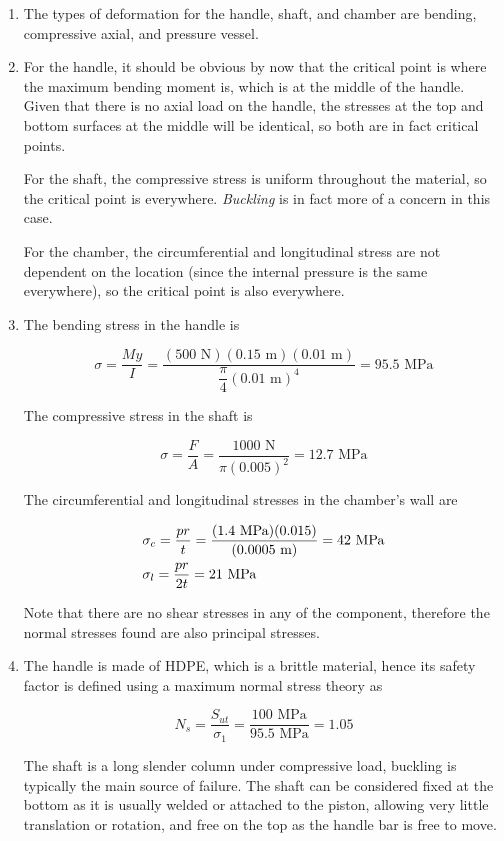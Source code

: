 \documentclass[
10pt,
a4paper,
openany,
svgnames,
]{book}
\begin{document}
\begin{enumerate}
\item The types of deformation for the handle, shaft, and chamber are bending, compressive axial, and pressure vessel.
\item For the handle, it should be obvious by now that the critical point is where the maximum bending moment is, which is at the middle of the handle. Given that there is no axial load on the handle, the stresses at the top and bottom surfaces at the middle will be identical, so both are in fact critical points.
  
  For the shaft, the compressive stress is uniform throughout the material, so the critical point is everywhere. \emph{Buckling} is in fact more of a concern in this case.
  
  For the chamber, the circumferential and longitudinal stress are not dependent on the location (since the internal pressure is the same everywhere), so the critical point is also everywhere.
  
\item The bending stress in the handle is

  \[\sigma = \frac{My}{I} = \frac{(500 \text{ N})(0.15 \text{ m})(0.01 \text{ m})}{\dfrac{\pi }{4}{(0.01 \text{ m})^4}} = 95.5 \text{ MPa}\]

The compressive stress in the shaft is

\[\sigma = \frac{F}{A} = \frac{1000 \text{ N}}{\pi (0.005)^2} = 12.7 \text{ MPa}\]

The circumferential and longitudinal stresses in the chamber’s wall are

\[\begin{gathered}
  \sigma_c = \frac{pr}{t} = \frac{(1.4 \text{ MPa})(0.015)}{(0.0005 \text{ m})} = 42 \text{ MPa} \hfill \\
  \sigma_l = \frac{pr}{2t} = 21 \text{ MPa} \hfill \\ 
\end{gathered} \]

Note that there are no shear stresses in any of the component, therefore the normal stresses found are also principal stresses.
\item The handle is made of HDPE, which is a brittle material, hence its safety factor is defined using a maximum normal stress theory as

  \[N_s = \frac{S_{ut}}{\sigma_1} = \frac{100\text{ MPa}}{95.5\text{ MPa}} = 1.05\]

The shaft is a long slender column under compressive load, buckling is typically the main source of failure. The shaft can be considered fixed at the bottom as it is usually welded or attached to the piston, allowing very little translation or rotation, and free on the top as the handle bar is free to move.


\end{enumerate}
\end{document}

